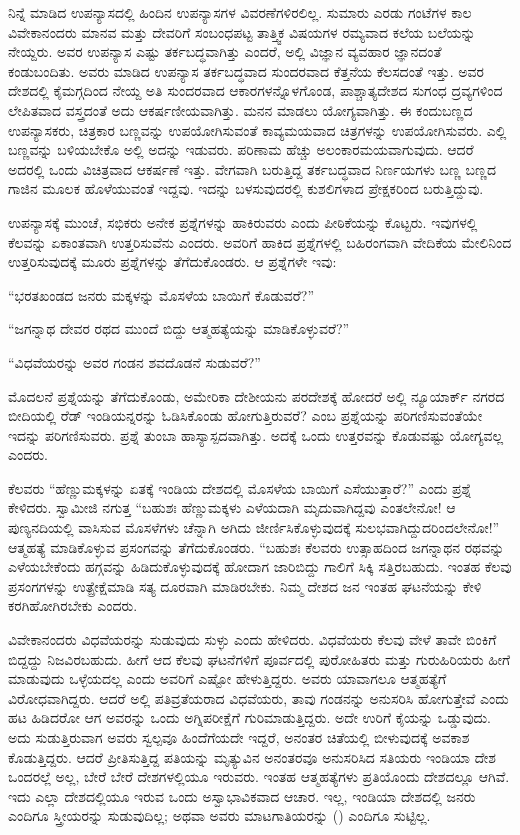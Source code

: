  ನಿನ್ನೆ ಮಾಡಿದ ಉಪನ್ಯಾಸದಲ್ಲಿ ಹಿಂದಿನ ಉಪನ್ಯಾಸಗಳ ವಿವರಣೆಗಳಿರಲಿಲ್ಲ. ಸುಮಾರು ಎರಡು ಗಂಟೆಗಳ ಕಾಲ ವಿವೇಕಾನಂದರು ಮಾನವ ಮತ್ತು ದೇವರಿಗೆ ಸಂಬಂಧಪಟ್ಟ ತಾತ್ತ್ವಿಕ ವಿಷಯಗಳ ರಮ್ಯವಾದ ಕಲೆಯ ಬಲೆಯನ್ನು ನೇಯ್ದರು. ಅವರ ಉಪನ್ಯಾಸ ಎಷ್ಟು ತರ್ಕಬದ್ಧವಾಗಿತ್ತು ಎಂದರೆ, ಅಲ್ಲಿ ವಿಜ್ಞಾನ ವ್ಯವಹಾರ ಜ್ಞಾನದಂತೆ ಕಂಡುಬಂದಿತು. ಅವರು ಮಾಡಿದ ಉಪನ್ಯಾಸ ತರ್ಕಬದ್ಧವಾದ ಸುಂದರವಾದ ಕೆತ್ತನೆಯ ಕೆಲಸದಂತೆ ಇತ್ತು. ಅವರ ದೇಶದಲ್ಲಿ ಕೈಮಗ್ಗದಿಂದ ನೇಯ್ದ ಅತಿ ಸುಂದರವಾದ ಆಕಾರಗಳನ್ನೊಳಗೊಂಡ, ಪಾಶ್ಚಾತ್ಯದೇಶದ ಸುಗಂಧ ದ್ರವ್ಯಗಳಿಂದ ಲೇಪಿತವಾದ ವಸ್ತ್ರದಂತೆ ಅದು ಆಕರ್ಷಣೀಯವಾಗಿತ್ತು. ಮನನ ಮಾಡಲು ಯೋಗ್ಯವಾಗಿತ್ತು. ಈ ಕಂದುಬಣ್ಣದ ಉಪನ್ಯಾಸಕರು, ಚಿತ್ರಕಾರ ಬಣ್ಣವನ್ನು ಉಪಯೋಗಿಸುವಂತೆ ಕಾವ್ಯಮಯವಾದ ಚಿತ್ರಗಳನ್ನು ಉಪಯೋಗಿಸುವರು. ಎಲ್ಲಿ ಬಣ್ಣವನ್ನು ಬಳಿಯಬೇಕೊ ಅಲ್ಲಿ ಅದನ್ನು ಇಡುವರು. ಪರಿಣಾಮ ಹೆಚ್ಚು ಅಲಂಕಾರಮಯವಾಗುವುದು. ಆದರೆ ಅದರಲ್ಲಿ ಒಂದು ವಿಚಿತ್ರವಾದ ಆಕರ್ಷಣೆ ಇತ್ತು. ವೇಗವಾಗಿ ಬರುತ್ತಿದ್ದ ತರ್ಕಬದ್ಧವಾದ ನಿರ್ಣಯಗಳು ಬಣ್ಣ ಬಣ್ಣದ ಗಾಜಿನ ಮೂಲಕ ಹೊಳೆಯುವಂತೆ ಇದ್ದವು. ಇದನ್ನು ಬಳಸುವುದರಲ್ಲಿ ಕುಶಲಿಗಳಾದ ಪ್ರೇಕ್ಷಕರಿಂದ ಬರುತ್ತಿದ್ದುವು. 

 ಉಪನ್ಯಾಸಕ್ಕೆ ಮುಂಚೆ, ಸಭಿಕರು ಅನೇಕ ಪ್ರಶ್ನೆಗಳನ್ನು ಹಾಕಿರುವರು ಎಂದು ಪೀಠಿಕೆಯನ್ನು ಕೊಟ್ಟರು. ಇವುಗಳಲ್ಲಿ ಕೆಲವನ್ನು ಏಕಾಂತವಾಗಿ ಉತ್ತರಿಸುವೆನು ಎಂದರು. ಅವರಿಗೆ ಹಾಕಿದ ಪ್ರಶ್ನೆಗಳಲ್ಲಿ ಬಹಿರಂಗವಾಗಿ ವೇದಿಕೆಯ ಮೇಲಿನಿಂದ ಉತ್ತರಿಸುವುದಕ್ಕೆ ಮೂರು ಪ್ರಶ್ನೆಗಳನ್ನು ತೆಗೆದುಕೊಂಡರು. ಆ ಪ್ರಶ್ನೆಗಳೇ ಇವು: 

 “ಭರತಖಂಡದ ಜನರು ಮಕ್ಕಳನ್ನು ಮೊಸಳೆಯ ಬಾಯಿಗೆ ಕೊಡುವರೆ?” 

 “ಜಗನ್ನಾಥ ದೇವರ ರಥದ ಮುಂದೆ ಬಿದ್ದು ಆತ್ಮಹತ್ಯೆಯನ್ನು ಮಾಡಿಕೊಳ್ಳುವರೆ?” 

 “ವಿಧವೆಯರನ್ನು ಅವರ ಗಂಡನ ಶವದೊಡನೆ ಸುಡುವರೆ?” 

 ಮೊದಲನೆ ಪ್ರಶ್ನೆಯನ್ನು ತೆಗೆದುಕೊಂಡು, ಅಮೇರಿಕಾ ದೇಶೀಯನು ಪರದೇಶಕ್ಕೆ ಹೋದರೆ ಅಲ್ಲಿ ನ್ಯೂಯಾರ್ಕ್ ನಗರದ ಬೀದಿಯಲ್ಲಿ ರೆಡ್ ಇಂಡಿಯನ್ನರನ್ನು ಓಡಿಸಿಕೊಂಡು ಹೋಗುತ್ತಿರುವರೆ? ಎಂಬ ಪ್ರಶ್ನೆಯನ್ನು ಪರಿಗಣಿಸುವಂತೆಯೇ ಇದನ್ನು ಪರಿಗಣಿಸುವರು. ಪ್ರಶ್ನೆ ತುಂಬಾ ಹಾಸ್ಯಾಸ್ಪದವಾಗಿತ್ತು. ಅದಕ್ಕೆ ಒಂದು ಉತ್ತರವನ್ನು ಕೊಡುವಷ್ಟು ಯೋಗ್ಯವಲ್ಲ ಎಂದರು. 

 ಕೆಲವರು “ಹೆಣ್ಣುಮಕ್ಕಳನ್ನು ಏತಕ್ಕೆ ಇಂಡಿಯ ದೇಶದಲ್ಲಿ ಮೊಸಳೆಯ ಬಾಯಿಗೆ ಎಸೆಯುತ್ತಾರೆ?” ಎಂದು ಪ್ರಶ್ನೆ ಕೇಳಿದರು. ಸ್ವಾಮೀಜಿ ನಗುತ್ತ “ಬಹುಶಃ ಹೆಣ್ಣುಮಕ್ಕಳು ಎಳೆಯದಾಗಿ ಮೃದುವಾಗಿದ್ದವು ಎಂತಲೇನೋ! ಆ ಪುಣ್ಯನದಿಯಲ್ಲಿ ವಾಸಿಸುವ ಮೊಸಳೆಗಳು ಚೆನ್ನಾಗಿ ಅಗಿದು ಜೀರ್ಣಿಸಿಕೊಳ್ಳುವುದಕ್ಕೆ ಸುಲಭವಾಗಿದ್ದುದರಿಂದಲೇನೋ!” ಆತ್ಮಹತ್ಯೆ ಮಾಡಿಕೊಳ್ಳುವ ಪ್ರಸಂಗವನ್ನು ತೆಗೆದುಕೊಂಡರು. “ಬಹುಶಃ ಕೆಲವರು ಉತ್ಸಾಹದಿಂದ ಜಗನ್ನಾಥನ ರಥವನ್ನು ಎಳೆಯಬೇಕೆಂದು ಹಗ್ಗವನ್ನು ಹಿಡಿದುಕೊಳ್ಳುವುದಕ್ಕೆ ಹೋದಾಗ ಜಾರಿಬಿದ್ದು ಗಾಲಿಗೆ ಸಿಕ್ಕಿ ಸತ್ತಿರಬಹುದು. ಇಂತಹ ಕೆಲವು ಪ್ರಸಂಗಗಳನ್ನು ಉತ್ಪ್ರೇಕ್ಷೆಮಾಡಿ ಸತ್ಯ ದೂರವಾಗಿ ಮಾಡಿರಬೇಕು. ನಿಮ್ಮ ದೇಶದ ಜನ ಇಂತಹ ಘಟನೆಯನ್ನು ಕೇಳಿ ಕರಗಿಹೋಗಿರಬೇಕು ಎಂದರು. 

 ವಿವೇಕಾನಂದರು ವಿಧವೆಯರನ್ನು ಸುಡುವುದು ಸುಳ್ಳು ಎಂದು ಹೇಳಿದರು. ವಿಧವೆಯರು ಕೆಲವು ವೇಳೆ ತಾವೇ ಬಿಂಕಿಗೆ ಬಿದ್ದದ್ದು ನಿಜವಿರಬಹುದು. ಹೀಗೆ ಆದ ಕೆಲವು ಘಟನೆಗಳಿಗೆ ಪೂರ್ವದಲ್ಲಿ ಪುರೋಹಿತರು ಮತ್ತು ಗುರುಹಿರಿಯರು ಹೀಗೆ ಮಾಡುವುದು ಒಳ್ಳೆಯದಲ್ಲ ಎಂದು ಅವರಿಗೆ ಎಷ್ಟೋ ಹೇಳುತ್ತಿದ್ದರು. ಅವರು ಯಾವಾಗಲೂ ಆತ್ಮಹತ್ಯೆಗೆ ವಿರೋಧವಾಗಿದ್ದರು. ಆದರೆ ಅಲ್ಲಿ ಪತಿವ್ರತೆಯರಾದ ವಿಧವೆಯರು, ತಾವು ಗಂಡನನ್ನು ಅನುಸರಿಸಿ ಹೋಗುತ್ತೇವೆ ಎಂದು ಹಟ ಹಿಡಿದರೋ ಆಗ ಅವರನ್ನು ಒಂದು ಅಗ್ನಿಪರೀಕ್ಷೆಗೆ ಗುರಿಮಾಡುತ್ತಿದ್ದರು. ಅದೇ ಉರಿಗೆ ಕೈಯನ್ನು ಒಡ್ಡುವುದು. ಅದು ಸುಡುತ್ತಿರುವಾಗ ಅವರು ಸ್ವಲ್ಪವೂ ಹಿಂದೆಗೆಯದೇ ಇದ್ದರೆ, ಅನಂತರ ಚಿತೆಯಲ್ಲಿ ಬೀಳುವುದಕ್ಕೆ ಅವಕಾಶ ಕೊಡುತ್ತಿದ್ದರು. ಆದರೆ ಪ್ರೀತಿಸುತ್ತಿದ್ದ ಪತಿಯನ್ನು ಮೃತ್ಯುವಿನ ಅನಂತರವೂ ಅನುಸರಿಸಿದ ಸತಿಯರು ಇಂಡಿಯಾ ದೇಶ ಒಂದರಲ್ಲೆ ಅಲ್ಲ, ಬೇರೆ ಬೇರೆ ದೇಶಗಳಲ್ಲಿಯೂ ಇರುವರು. ಇಂತಹ ಆತ್ಮಹತ್ಯೆಗಳು ಪ್ರತಿಯೊಂದು ದೇಶದಲ್ಲೂ ಆಗಿವೆ. ಇದು ಎಲ್ಲಾ ದೇಶದಲ್ಲಿಯೂ ಇರುವ ಒಂದು ಅಸ್ವಾಭಾವಿಕವಾದ ಆಚಾರ. ಇಲ್ಲ, ಇಂಡಿಯಾ ದೇಶದಲ್ಲಿ ಜನರು ಎಂದಿಗೂ ಸ್ತ್ರೀಯರನ್ನು ಸುಡುವುದಿಲ್ಲ; ಅಥವಾ ಅವರು ಮಾಟಗಾತಿಯರನ್ನು () ಎಂದಿಗೂ ಸುಟ್ಟಿಲ್ಲ. 

